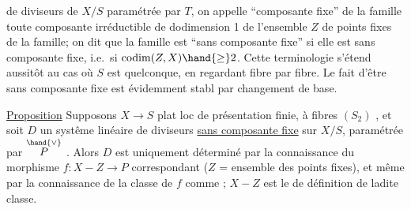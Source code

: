 
de diviseurs de $X/S$ paramétrée par $T$, on appelle ``composante fixe'' de la
famille toute composante irréductible de dodimension 1 de l'ensemble $Z$ de
points fixes de la famille; on dit que la famille est ``sans composante
fixe'' si elle est sans composante fixe, i.e.\ si $\operatorname{codim}(Z,X) \hand{\geq} 2$. Cette
terminologie s'étend aussitôt au cas où $S$ est quelconque, en regardant
fibre par fibre. Le fait d'être sans composante fixe est évidemment stabl
par changement de base.

\uline{Proposition} \hand{/}Supposons $X \longrightarrow S$ plat loc de présentation finie, à fibres
$(S_2)$ , et soit $D$ un systême linéaire de diviseurs \uline{sans composante fixe}
sur $X/S$, paramétrée par $\overset{\hand{\vee}}{P}$ . Alors $D$ est uniquement déterminé par la
connaissance du morphisme $f: X - Z \longrightarrow P$ correspondant ($Z$ = ensemble
des points fixes), et même par la connaissance de la classe de $f$ comme
  ; $X-Z$ est le 
de définition de ladite classe.

